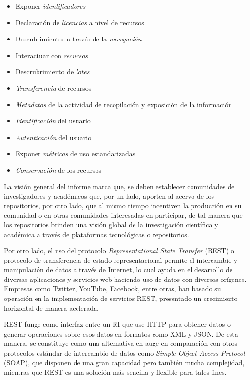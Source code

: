 \begin{itemize}
\item Exponer \textit{identificadores}
\item Declaraci\'on de \textit{licencias} a nivel de recursos
\item Descubrimientos a trav\'es de la \textit{navegaci\'on}
\item Interactuar con \textit{recursos}
\item Descrubrimiento de \textit{lotes}
\item \textit{Transferencia} de recursos
\item \textit{Metadatos} de la actividad de recopilaci\'on y exposici\'on de la informaci\'on
\item \textit{Identificaci\'on} del usuario
\item \textit{Autenticaci\'on} del usuario
\item Exponer \textit{m\'etricas} de uso estandarizadas
\item \textit{Conservaci\'on} de los recursos
\end{itemize}

La visi\'on general del informe marca que, se deben establecer comunidades de investigadores y acad\'emicos que, por un lado, aporten al acervo de los repositorios, por otro lado, que al mismo tiempo incentiven la producci\'on en su comunidad o en otras comunidades interesadas en participar, de tal manera que los repositorios brinden una visi\'on global de la investigaci\'on cient\'ifica y acad\'emica a trav\'es de plataformas tecnol\'ogicas o repositorios.

Por otro lado, el uso del protocolo \textit{Representational State Transfer} (REST) o protocolo de transferencia de estado representacional permite el intercambio y manipulaci\'on de datos a trav\'es de Internet, lo cual ayuda en el desarrollo de diversas aplicaciones y servicios web haciendo uso de datos con diversos or\'igenes. Empresas como Twitter, YouTube, Facebook, entre otras, han basado su operaci\'on en la implementaci\'on de servicios REST, presentado un crecimiento horizontal de manera acelerada.

REST funge como interfaz entre un RI que use HTTP para obtener datos o generar operaciones sobre esos datos en formatos como XML y JSON. De esta manera, se constituye como una alternativa en auge en comparaci\'on con otros protocolos est\'andar de intercambio de datos como \textit{Simple Object Access Protocol} (SOAP), que disponen de una gran capacidad pero tambi\'en mucha complejidad, mientras que REST es una soluci\'on m\'as sencilla y flexible para tales fines.

